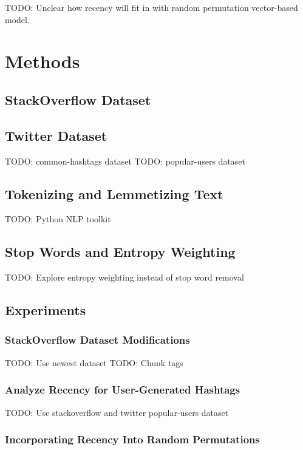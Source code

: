 \documentclass[man]{apa6}
\begin{document}
TODO: Unclear how recency will fit in with random permutation vector-based model.

\section{Methods}

\subsection{StackOverflow Dataset}

\cite{DataDump2013}

\subsection{Twitter Dataset}

TODO: common-hashtags dataset
TODO: popular-users dataset

\subsection{Tokenizing and Lemmetizing Text}

TODO: Python NLP toolkit \cite{Bird2009}

\subsection{Stop Words and Entropy Weighting}

TODO: Explore entropy weighting instead of stop word removal \cite{Dumais1991}

\subsection{Experiments}

\subsubsection{StackOverflow Dataset Modifications}

TODO: Use newest dataset
TODO: Chunk tags

\subsubsection{Analyze Recency for User-Generated Hashtags}

TODO: Use stackoverflow and twitter popular-users dataset

\subsubsection{Incorporating Recency Into Random Permutations}
\end{document}
